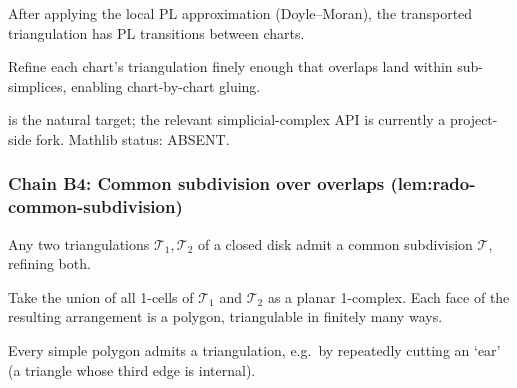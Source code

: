 \begin{lemma}
\label{lem:rtc-r3}
After applying the local PL approximation (Doyle--Moran), the transported triangulation has PL transitions between charts.
\leanok
\end{lemma}

\begin{lemma}
\label{lem:rtc-r4}
Refine each chart's triangulation finely enough that overlaps land within sub-simplices, enabling chart-by-chart gluing.
\leanok
\end{lemma}

\begin{lemma}
\label{lem:rtc-r5}
 is the natural target; the relevant simplicial-complex API is currently a project-side fork.  Mathlib status: ABSENT.
\leanok
\end{lemma}

\subsubsection*{Chain B4: Common subdivision over overlaps (lem:rado-common-subdivision)}

\begin{lemma}
\label{lem:rcs-r1}
Any two triangulations $\mathcal{T}_{1}, \mathcal{T}_{2}$ of a closed disk admit a common subdivision $\mathcal{T}$, refining both.
\leanok
\end{lemma}

\begin{lemma}
\label{lem:rcs-r2}
Take the union of all 1-cells of $\mathcal{T}_{1}$ and $\mathcal{T}_{2}$ as a planar 1-complex.  Each face of the resulting arrangement is a polygon, triangulable in finitely many ways.
\leanok
\end{lemma}

\begin{lemma}
\label{lem:rcs-r3}
Every simple polygon admits a triangulation, e.g.\ by repeatedly cutting an `ear' (a triangle whose third edge is internal).
\leanok
\end{lemma}

